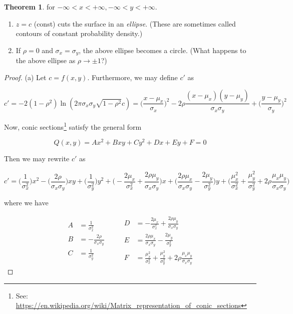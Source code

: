 \documentclass[10pt, oneside]{article}   	%
\theoremstyle{definition}
\newtheorem*{thm}{Theorem}
\begin{document}
\begin{enumerate}[label=9.\arabic*]
\begin{thm}
for $-\infty < x < +\infty, -\infty < y < +\infty$.

\begin{enumerate}
\item $z = c$ (const) cuts the surface in an \textit{ellipse}. (These are sometimes called contours of constant probability density.)
\item If $\rho = 0$ and $\sigma_x = \sigma_y$, the above ellipse becomes a circle. (What happens to the above ellipse as $\rho \rightarrow \pm 1$?)
\end{enumerate}
\end{thm}

\begin{proof}
(a) Let $c = f(x,y)$. Furthermore, we may define $c'$ as

\[ c' = -2(1-\rho^2) \ln (2\pi \sigma_x \sigma_y \sqrt{1-\rho^2} c) = \bigg( \frac{x - \mu_x}{\sigma_x} \bigg)^2 - 2\rho \frac{(x - \mu_x)(y - \mu_y)}{\sigma_x \sigma_y} + \bigg( \frac{y - \mu_y}{\sigma_y} \bigg)^2 \]

Now, conic sections\footnote{See: \url{https://en.wikipedia.org/wiki/Matrix_representation_of_conic_sections}} satisfy the general form

\[ Q(x,y) = Ax^2 + Bxy + Cy^2 + Dx + Ey + F = 0 \]

Then we may rewrite $c'$ as

\[ c' = \bigg( \frac{1}{\sigma^2_x} \bigg) x^2 - \bigg( \frac{2\rho}{\sigma_x \sigma_y} \bigg) xy + \bigg( \frac{1}{\sigma^2_y} \bigg) y^2 + \bigg( -\frac{2\mu_x}{\sigma^2_x} + \frac{2\rho\mu_y}{\sigma_x \sigma_y} \bigg) x + \bigg( \frac{2\rho \mu_x}{\sigma_x \sigma_y} - \frac{2\mu_y}{\sigma^2_y} \bigg) y + \bigg( \frac{\mu^2_x}{\sigma^2_x} + \frac{\mu^2_y}{\sigma^2_y} + 2\rho \frac{\mu_x \mu_y}{\sigma_x \sigma_y} \bigg) \]

where we have

\begin{equation*}
\begin{split}
A &=  \frac{1}{\sigma^2_x} \\
B &= -\frac{2\rho}{\sigma_x \sigma_y} \\
C &= \frac{1}{\sigma^2_y}
\end{split}
\qquad
\begin{split}
D &=  -\frac{2\mu_x}{\sigma^2_x} + \frac{2\rho\mu_y}{\sigma_x \sigma_y} \\
E &=  \frac{2\rho \mu_x}{\sigma_x \sigma_y} - \frac{2\mu_y}{\sigma^2_y} \\
F &=  \frac{\mu^2_x}{\sigma^2_x} + \frac{\mu^2_y}{\sigma^2_y} + 2\rho \frac{\mu_x \mu_y}{\sigma_x \sigma_y}
\end{split}
\end{equation*}


\end{proof}
\end{enumerate}
\end{document}
